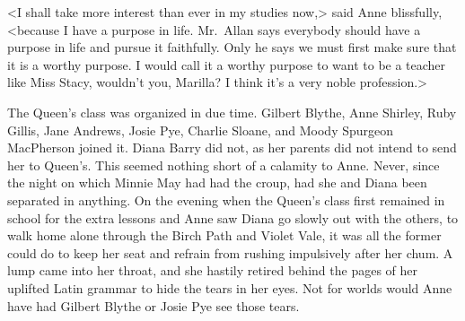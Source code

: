 <I shall take more interest than ever in my studies now,> said Anne blissfully, <because I have a purpose in life. Mr.~Allan says everybody should have a purpose in life and pursue it faithfully. Only he says we must first make sure that it is a worthy purpose. I would call it a worthy purpose to want to be a teacher like Miss Stacy, wouldn't you, Marilla? I think it's a very noble profession.>

The Queen's class was organized in due time. Gilbert Blythe, Anne Shirley, Ruby Gillis, Jane Andrews, Josie Pye, Charlie Sloane, and Moody Spurgeon MacPherson joined it. Diana Barry did not, as her parents did not intend to send her to Queen's. This seemed nothing short of a calamity to Anne. Never, since the night on which Minnie May had had the croup, had she and Diana been separated in anything. On the evening when the Queen's class first remained in school for the extra lessons and Anne saw Diana go slowly out with the others, to walk home alone through the Birch Path and Violet Vale, it was all the former could do to keep her seat and refrain from rushing impulsively after her chum. A lump came into her throat, and she hastily retired behind the pages of her uplifted Latin grammar to hide the tears in her eyes. Not for worlds would Anne have had Gilbert Blythe or Josie Pye see those tears.

